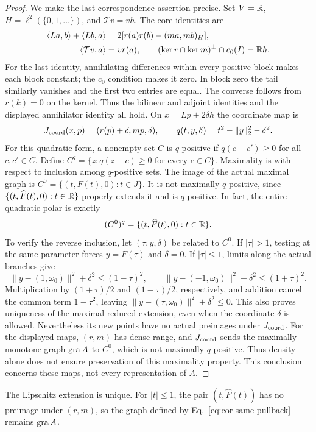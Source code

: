 \begin{proof}
We make the last correspondence assertion precise. Set $V=\mathbb R$,
$H=\ell^2(\{0,1,\ldots\})$, and $\mathcal T v=vh$. The core identities are
\begin{align*}
\langle La,b\rangle+\langle Lb,a\rangle&=2[r(a)r(b)-(ma,mb)_H],\\
\langle \mathcal T v,a\rangle&=v r(a),\qquad
(\ker r\cap\ker m)^\perp\cap c_0(I)=\mathbb R h.
\end{align*}
For the last identity, annihilating differences within every positive
block makes each block constant; the $c_0$ condition makes it zero.
In block zero the tail similarly vanishes and the first two entries
are equal. The converse follows from $r(k)=0$ on the kernel.
Thus the bilinear and adjoint identities and the displayed annihilator
identity all hold.
On $x=Lp+2\delta h$ the coordinate map is
\[
J_{\rm coord}(x,p)=(r(p)+\delta,mp,\delta),\qquad
q(t,y,\delta)=t^2-\|y\|_2^2-\delta^2.
\]
For this quadratic form, a nonempty set $C$ is $q$-positive if
$q(c-c')\ge0$ for all $c,c'\in C$. Define
$C^q=\{z:q(z-c)\ge0\text{ for every }c\in C\}$.
Maximality is with respect to inclusion among $q$-positive sets.
The image of the actual maximal graph is
$C^0=\{(t,F(t),0):t\in J\}$. It is not maximally $q$-positive,
since $\{(t,\widehat F(t),0):t\in\mathbb R\}$ properly extends it and
is $q$-positive. In fact, the entire quadratic polar is exactly
\[
(C^0)^q=\{(t,\widehat F(t),0):t\in\mathbb R\}.
\]
To verify the reverse inclusion, let $(\tau,y,\delta)$ be related
to $C^0$. If $|\tau|>1$, testing at the same parameter forces
$y=F(\tau)$ and $\delta=0$. If $|\tau|\le1$, limits along the
actual branches give
\[
\|y-(1,\omega_0)\|^2+\delta^2\le(1-\tau)^2,\qquad
\|y-(-1,\omega_0)\|^2+\delta^2\le(1+\tau)^2.
\]
Multiplication by $(1+\tau)/2$ and $(1-\tau)/2$, respectively,
and addition cancel the common term $1-\tau^2$, leaving
$\|y-(\tau,\omega_0)\|^2+\delta^2\le0$.
This also proves uniqueness of the maximal reduced extension, even
when the coordinate $\delta$ is allowed. Nevertheless its new points
have no actual preimages under $J_{\rm coord}$.
For the displayed maps, $(r,m)$ has dense range, and $J_{\rm coord}$
sends the maximally monotone graph $\operatorname{gra} A$ to $C^0$, which is not
maximally $q$-positive. Thus density alone does not ensure preservation
of this maximality property. This conclusion concerns these maps,
not every representation of $A$.
\end{proof}
The Lipschitz extension is unique. For $|t|\le1$, the pair
$(t,\widehat F(t))$ has no preimage under $(r,m)$, so the graph defined
by Eq.~\eqref{eq:cor-same-pullback} remains $\operatorname{gra} A$.

